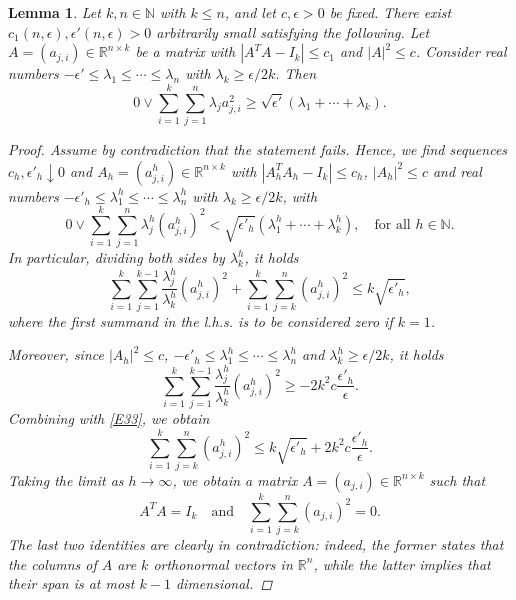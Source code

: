 \documentclass[10pt]{article}
\newtheorem{lemma}[thm]{Lemma}
\theoremstyle{definition}
\newcommand{\bb}[1]{\mathbb{#1}}
\begin{document}
\begin{lemma} \label{L14}
    Let $k,n \in \bb{N}$ with $k \leq n$, and let $c,\epsilon>0$ be fixed. There exist $c_1(n,\epsilon),\epsilon'(n,\epsilon)>0$ arbitrarily small satisfying the following. Let $A=(a_{j,i}) \in \bb{R}^{n \times k}$ be a matrix with $|A^T A-I_k| \leq c_1$ and $|A|^2 \leq c$. Consider real numbers $-\epsilon' \leq \lambda_1 \leq \cdots \leq \lambda_n$ with $\lambda_k \geq \epsilon/2k$.
    Then
    \[
    0 \vee
   \sum_{i=1}^k\sum_{j=1}^n \lambda_j a_{j,i}^2 \geq \sqrt{\epsilon'} (\lambda_1+ \cdots + \lambda_k).
    \]
    \begin{proof}
        Assume by contradiction that the statement fails. 
        Hence, we find sequences $c_h,\epsilon'_h \downarrow 0$ and 
        $A_h=(a^h_{j,i}) \in \bb{R}^{n \times k}$ with $|A^T_h A_h-I_k| \leq c_h$, $|A_h|^2 \leq c$ and real numbers $-\epsilon'_h \leq \lambda^h_1 \leq \cdots \leq \lambda^h_n$ with $\lambda_k \geq \epsilon/2k$, with
    \[
    0 \vee
    \sum_{i=1}^k\sum_{j=1}^n \lambda^h_j (a^h_{j,i})^2 < \sqrt{\epsilon'_h} (\lambda^h_1+ \cdots + \lambda^h_k),\quad  \text{for all } h\in \mathbb{N}.
    \]
    In particular, dividing both sides by $\lambda_k^h$, it holds 
    \begin{equation} \label{E33}
    \sum_{i=1}^k
   \sum_{j=1}^{k-1} \frac{\lambda^h_j}{\lambda^h_k} (a^h_{j,i})^2
   +
   \sum_{i=1}^k\sum_{j=k}^n (a^h_{j,i})^2
   \leq 
   k\sqrt{\epsilon'_h},
    \end{equation}
    where the first summand in the l.h.s. is to be considered zero if $k=1$.
\par 
Moreover, since $|A_h|^2 \leq c$, $-\epsilon'_h \leq \lambda^h_1 \leq \cdots \leq \lambda^h_n$ and $\lambda^h_k \geq \epsilon/2k$, it holds
    \[
    \sum_{i=1}^k
   \sum_{j=1}^{k-1} \frac{\lambda^h_j}{\lambda^h_k} (a^h_{j,i})^2 \geq -2k^2c\frac{\epsilon'_h}{\epsilon}.
    \]
    Combining with \eqref{E33}, we obtain
    \[
   \sum_{i=1}^k\sum_{j=k}^n (a^h_{j,i})^2
   \leq 
   k\sqrt{\epsilon'_h}+2k^2c\frac{\epsilon'_h}{\epsilon}.
    \]
    Taking the limit as $h \to \infty$, we obtain a matrix $A=(a_{j,i}) \in \bb{R}^{n \times k}$ such that 
    \begin{equation*} %
    A^TA=I_k \quad \text{and} \quad  \sum_{i=1}^k\sum_{j=k}^n (a_{j,i})^2 = 0.
    \end{equation*}
    The last two identities are clearly in contradiction: indeed, the former states that the  columns of $A$ are $k$ orthonormal vectors in $\bb{R}^n$, while the latter  implies that their  span is at most $k-1$ dimensional.
    \end{proof}
\end{lemma}
\end{document}
